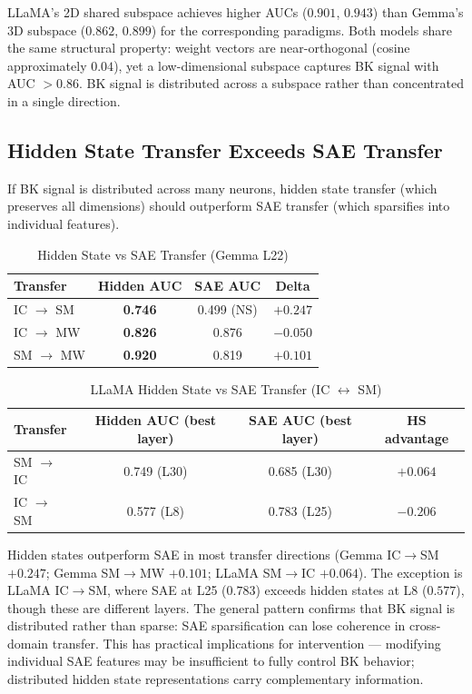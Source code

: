 \documentclass[11pt,a4paper]{article}
\begin{document}
\noindent LLaMA's 2D shared subspace achieves higher AUCs ($0.901$, $0.943$) than Gemma's 3D subspace ($0.862$, $0.899$) for the corresponding paradigms. Both models share the same structural property: weight vectors are near-orthogonal (cosine approximately $0.04$), yet a low-dimensional subspace captures BK signal with AUC $> 0.86$. BK signal is distributed across a subspace rather than concentrated in a single direction.

\subsection{Hidden State Transfer Exceeds SAE Transfer}

If BK signal is distributed across many neurons, hidden state transfer (which preserves all dimensions) should outperform SAE transfer (which sparsifies into individual features).

\begin{table}[H]
\centering
\caption{Hidden State vs SAE Transfer (Gemma L22)}\label{tab:t11}
\footnotesize
\begin{tabular}{lccc}
\toprule
Transfer & Hidden AUC & SAE AUC & Delta \\
\midrule
IC $\rightarrow$ SM & \textbf{0.746} & 0.499 (NS) & $+0.247$ \\
IC $\rightarrow$ MW & \textbf{0.826} & 0.876 & $-0.050$ \\
SM $\rightarrow$ MW & \textbf{0.920} & 0.819 & $+0.101$ \\
\bottomrule
\end{tabular}
\end{table}

\begin{table}[H]
\centering
\caption{LLaMA Hidden State vs SAE Transfer (IC $\leftrightarrow$ SM)}\label{tab:t12}
\footnotesize
\begin{tabular}{lccc}
\toprule
Transfer & Hidden AUC (best layer) & SAE AUC (best layer) & HS advantage \\
\midrule
SM $\rightarrow$ IC & 0.749 (L30) & 0.685 (L30) & $+0.064$ \\
IC $\rightarrow$ SM & 0.577 (L8) & 0.783 (L25) & $-0.206$ \\
\bottomrule
\end{tabular}
\end{table}

\noindent Hidden states outperform SAE in most transfer directions (Gemma IC$\rightarrow$SM $+0.247$; Gemma SM$\rightarrow$MW $+0.101$; LLaMA SM$\rightarrow$IC $+0.064$). The exception is LLaMA IC$\rightarrow$SM, where SAE at L25 ($0.783$) exceeds hidden states at L8 ($0.577$), though these are different layers. The general pattern confirms that BK signal is distributed rather than sparse: SAE sparsification can lose coherence in cross-domain transfer. This has practical implications for intervention --- modifying individual SAE features may be insufficient to fully control BK behavior; distributed hidden state representations carry complementary information.
\end{document}
